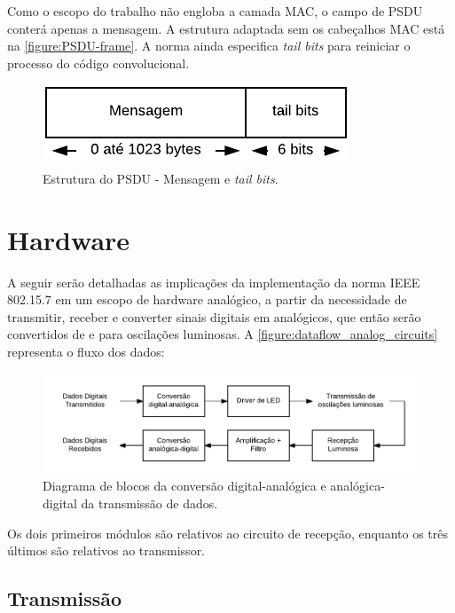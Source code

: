 	Como o escopo do trabalho não engloba a camada MAC, o campo de PSDU conterá apenas a mensagem. A estrutura adaptada sem os cabeçalhos MAC está na \autoref{figure:PSDU-frame}. A norma ainda especifica \textit{tail bits} para reiniciar o processo do código convolucional.
	
	\begin{figure}[h]
		\caption{\label{figure:PSDU-frame}Estrutura do PSDU - Mensagem e \textit{tail bits}.}
		\centering
		\includegraphics[width=0.4\textheight]{frame/PSDU.pdf}
	\end{figure}
	
	\section{Hardware}\label{sec:method-hardware}
	
	A seguir serão detalhadas as implicações da implementação da norma IEEE 802.15.7 em um escopo de hardware analógico, a partir da necessidade de transmitir, receber e converter sinais digitais em analógicos, que então serão convertidos de e para oscilações luminosas. A \autoref{figure:dataflow_analog_circuits} representa o fluxo dos dados:
	
	\begin{figure}[h!]
		\caption{\label{figure:dataflow_analog_circuits}Diagrama de blocos da conversão digital-analógica e analógica-digital da transmissão de dados.}
		\centering
		\includegraphics[width=0.6\textheight]{circuits/dataflow_analog_circuits.pdf}
	\end{figure}
	Os dois primeiros módulos são relativos ao circuito de recepção, enquanto os três últimos são relativos ao transmissor.
	
	\subsection{Transmissão}
	
